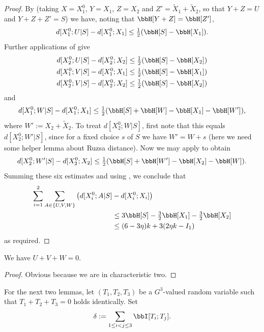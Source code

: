 \begin{proof}
  \leanok
  By  (taking $X = X_1^0$, $Y = X_1$, $Z = X_2$ and $Z' = \tilde X_1 + \tilde X_2$, so that $Y + Z = U$ and $Y + Z + Z' = S$) we have, noting that $\bbH[Y+ Z] = \bbH[Z']$,
  \[
    d[X^0_1;U|S] - d[X^0_1;X_1] \leq \tfrac{1}{2} (\bbH[S] -  \bbH[X_1]).
  \]
  Further applications of  give
  \begin{align*}
  d[X^0_2;U|S] - d[X^0_2; X_2] &\leq \tfrac{1}{2} (\bbH[S] -  \bbH[X_2]) \\
  d[X^0_1;V|S] - d[X^0_1;X_1] &\leq \tfrac{1}{2} (\bbH[S] -  \bbH[X_1])\\
  d[X^0_2;V|S] - d[X^0_2;X_2] &\leq \tfrac{1}{2} (\bbH[S] -  \bbH[X_2])
  \end{align*}
  and
  \[d[X^0_1;W|S] - d[X^0_1;X_1] \leq \tfrac{1}{2} (\bbH[S] + \bbH[W] - \bbH[X_1] - \bbH[W']),\] where $W' := X_2 + \tilde X_2$.
  To treat $d[X^0_2;W|S]$, first note that this equals $d[X^0_2;W'|S]$, since for a fixed choice $s$ of $S$ we have $W' = W + s$ (here we need some helper lemma about Ruzsa distance). Now we may apply  to obtain
  \[d[X^0_2;W'|S] - d[X^0_2;X_2] \leq \tfrac{1}{2} (\bbH[S] + \bbH[W'] - \bbH[X_2] - \bbH[W]).\]
  Summing these six estimates and using , we conclude that
  \begin{align*}
    \sum_{i=1}^2 \sum_{A\in\{U,V,W\}} \big(d[X^0_i;A|S] & - d[X^0_i;X_i]\big) \\
      &\leq 3 \bbH[S] - \tfrac{3}{2} \bbH[X_1] - \tfrac{3}{2} \bbH[X_2]\\
      &\leq (6 - 3\eta) k + 3(2 \eta k - I_1)
  \end{align*}
  as required.
\end{proof}

\begin{lemma}\label{key-ident}
\leanok
We have $U+V+W=0$.
\end{lemma}

\begin{proof} \leanok Obvious because we are in characteristic two.
\end{proof}

For the next two lemmas, let $(T_1,T_2,T_3)$ be a $G^3$-valued random variable such that $T_1+T_2+T_3=0$ holds identically. Set
\begin{equation}\label{delta-t1t2t3-def}
  \delta := \sum_{1 \leq i < j \leq 3} \bbI[T_i;T_j].
\end{equation}

